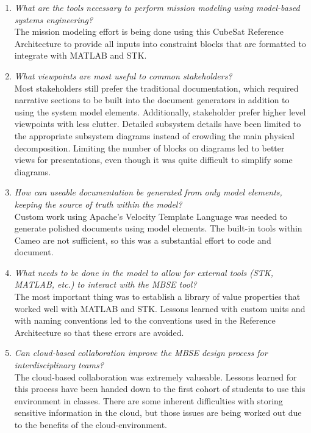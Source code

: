 \begin{enumerate}
\item{\textit{What are the tools necessary to perform mission modeling using model-based systems engineering?}}\\
The mission modeling effort is being done using this CubeSat Reference Architecture to provide all inputs into constraint blocks that are formatted to integrate with MATLAB and STK. 
\item{\textit{What viewpoints are most useful to common stakeholders?}}\\
Most stakeholders still prefer the traditional documentation, which required narrative sections to be built into the document generators in addition to using the system model elements. Additionally, stakeholder prefer higher level viewpoints with less clutter. Detailed subsystem details have been limited to the appropriate subsystem diagrams instead of crowding the main physical decomposition. Limiting the number of blocks on diagrams led to better views for presentations, even though it was quite difficult to simplify some diagrams. 
\item{\textit{How can useable documentation be generated from only model elements, keeping the source of truth within the model?}}\\
Custom work using Apache's Velocity Template Language was needed to generate polished documents using model elements. The built-in tools within Cameo are not sufficient, so this was a substantial effort to code and document.
\item{\textit{What needs to be done in the model to allow for external tools (STK, MATLAB, etc.) to interact with the MBSE tool?}}\\
The most important thing was to establish a library of value properties that worked well with MATLAB and STK. Lessons learned with custom units and with naming conventions led to the conventions used in the Reference Architecture so that these errors are avoided. 
\item{\textit{Can cloud-based collaboration improve the MBSE design process for interdisciplinary teams?}}\\
The cloud-based collaboration was extremely valueable. Lessons learned for this process have been handed down to the first cohort of students to use this environment in classes. There are some inherent difficulties with storing sensitive information in the cloud, but those issues are being worked out due to the benefits of the cloud-environment. 

\end{enumerate}